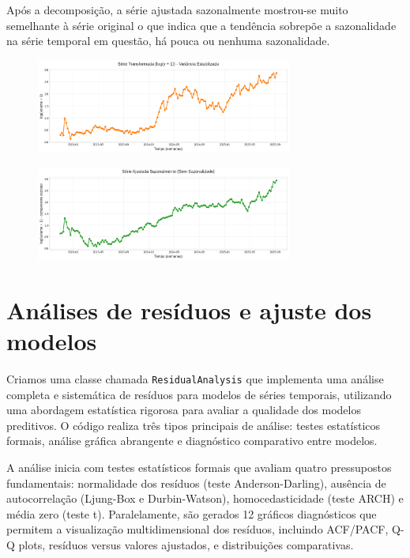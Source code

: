 \documentclass{article}
\begin{document}
Após a decomposição, a série ajustada sazonalmente mostrou-se muito semelhante à série original o que indica que a tendência sobrepõe a sazonalidade na série temporal em questão, há pouca ou nenhuma sazonalidade.

\begin{figure}[h!]
    \centering
    \includegraphics[width=0.75\textwidth]{images/serie_transformada.png}
    \label{fig:serie-transformada}

    \centering
    \includegraphics[width=0.75\textwidth]{images/serie_ajustada_sazonalmente.png}
    \label{fig:serie-ajustada-sazonalmente}
\end{figure}

\vspace{1em}

\section*{Análises de resíduos e ajuste dos modelos}

Criamos uma classe chamada \texttt{ResidualAnalysis} que implementa uma análise completa e sistemática de resíduos para modelos de séries temporais, utilizando uma abordagem estatística rigorosa para avaliar a qualidade dos modelos preditivos. O código realiza três tipos principais de análise: testes estatísticos formais, análise gráfica abrangente e diagnóstico comparativo entre modelos.

A análise inicia com testes estatísticos formais que avaliam quatro pressupostos fundamentais: normalidade dos resíduos (teste Anderson-Darling), ausência de autocorrelação (Ljung-Box e Durbin-Watson), homocedasticidade (teste ARCH) e média zero (teste t). Paralelamente, são gerados 12 gráficos diagnósticos que permitem a visualização multidimensional dos resíduos, incluindo ACF/PACF, Q-Q plots, resíduos versus valores ajustados, e distribuições comparativas.
\end{document}
